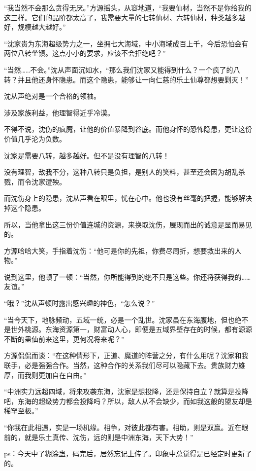 \begin{this_body}
“我当然不会那么贪得无厌。”方源摇头，从容地道，“我要仙材，当然不是你给我的这三样。它们的品阶都太高了，我需要大量的七转仙材、六转仙材，种类越多越好，规模越大越好。”

“沈家贵为东海超级势力之一，坐拥七大海域，中小海域成百上千，今后恐怕会有两位八转坐镇。这点小小的要求，应该不会拒绝吧？”

“当然……不会。”沈从声面沉如水，“那么我们沈家又能得到什么？一个疯了的八转？并且他还身怀隐患。而这个隐患，能够让一向仁慈的乐土仙尊都想要剿灭！”

沈从声绝对是一个合格的领袖。

涉及家族利益，他理智得近乎冷漠。

不得不说，沈伤的疯魔，让他的价值暴降到谷底。而他身怀的恐怖隐患，更让这份价值几乎沦为负数。

沈家是需要八转，越多越好。但不是没有理智的八转！

没有理智，敌我不分，这种八转只是负担，是别人的笑料，甚至还会因为胡乱杀戮，而令沈家遭殃。

而沈伤身上的隐患，沈从声看在眼里，忧在心中。他也没有丝毫的把握，能够解决掉这个隐患。

所以，当他拿出这三份价值连城的资源，来换取沈伤，展现而出的诚意是显而易见的。

方源哈哈大笑，手指着沈伤：“他可是你的先祖，你费尽周折，想要救出来的人物。”

说到这里，他顿了一顿：“当然，你所能得到的绝不只是这些。你还将获得我的……友谊。”

“哦？”沈从声顿时露出感兴趣的神色，“怎么说？”

“当今天下，地脉频动，五域一统，必是一个乱世。沈家虽在东海腹地，但也绝不是世外桃源。东海资源第一，财富动人心，即便是五域界壁存在的时候，都有源源不断的蛊仙前来这里，更何况将来呢？”

方源侃侃而谈：“在这种情形下，正道、魔道的阵营之分，有什么用呢？沈家和我联手，必是强强合作。当然，这种合作的关系我们尽可以隐藏下去。贵族财力雄厚，而我则更加自在自由。”

“中洲实力远超四域，将来攻袭东海，沈家是想投降，还是保持自立？就算是投降吧，东海的超级势力都会投降吗？所以，敌人从不会缺少，而如我这般的盟友却是稀罕至极。”

“你我在此相遇，实是一场机缘。相争，对彼此都有害。相助，则是双赢。近在眼前的，就是乐土真传、沈伤，远的则是中洲东海，天下大势！”

ps：今天中了糊涂蛊，码完后，居然忘记上传了。印象中总觉得是已经定时更新了的。

\end{this_body}

